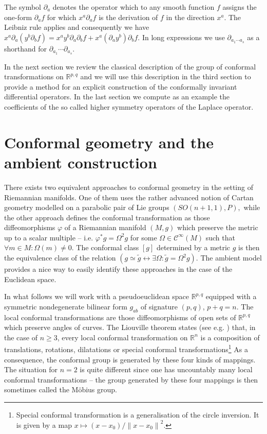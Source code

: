 \documentclass[final]{birkmult}
\theoremstyle{definition}
\theoremstyle{remark}
\numberwithin{equation}{section}
\newcommand{\p}[1]{\partial_{#1}}
\newcommand{\R}{\mathbb{R}^{p,q}}
\begin{document}
  The symbol $\p{a}$ denotes the operator which to any smooth function $f$ assigns the one-form $\p{a} f$ for which $x^a\p{a} f$ is the derivation of $f$ in the direction $x^a$. The Leibniz rule applies and consequently we have $x^a\p{a} (y^b\p{b}f) =x^a y^b \p{a} \p{b} f + x^a(\p{a}y^b) \p{b} f$. In long expressions we use $\p{a_1\cdots a_s}$ as a shorthand for $\p{a_1}\cdots \p{a_s}$.

  In the next section we review the classical  description of the group of conformal transformations on $\R$ and we will use this description in the third section to provide a method for an explicit construction of the conformally invariant differential operators. In the last section we compute as an example the coefficients of the so called higher symmetry operators of the Laplace operator. 

\section{Conformal geometry and the ambient construction}

  There exists two equivalent approaches to conformal geometry in the setting of Riemannian manifolds. One of them uses the rather advanced notion of Cartan geometry modelled on a parabolic pair of Lie groups $(SO(n+1,1),P),$ while the other approach defines the conformal transformation as those diffeomorphisms $\varphi$ of a Riemannian manifold $(M,g)$ which preserve the metric up to a scalar multiple -- i.e. $\varphi^* g = \Omega^2 g$ for some $\Omega\in\mathcal{C}^\infty(M)$ such that $\forall m\in M: \Omega(m) \neq 0$. The conformal class $[g]$ determined by a metric $g$ is then the equivalence class of the relation $(g \simeq \tilde{g} \leftrightarrow \exists \Omega: \tilde{g} = \Omega^2 g)$. The ambient model provides a nice way to easily identify these approaches in the case of the Euclidean space.

  In what follows we will work with a pseudoeuclidean space $\R$ equipped with a symmetric nondegenerate bilinear form $g_{ab}$ of signature $(p,q)$, $p+q=n$. The local conformal transformations are those diffeomorphisms of open sets of $\R$ which preserve angles of curves. The Liouville theorem states (see e.g. \cite{slovk_invariant_1992}) that, in the case of $n \geq 3$,  every local conformal transformation on $\mathbb{R}^n$ is a composition of translations, rotations, dilatations or special conformal transformations\footnote{Special conformal transformation is a generalisation of the circle inversion. It is given by a map $x \mapsto (x-x_0)/{\lVert x-x_0\rVert}^2$.} As a consequence, the conformal group is generated by these four kinds of mappings. The situation for $n=2$ is quite different since one has uncountably many local conformal transformations -- the group generated by these four mappings is then sometimes called the M\"obius group.
\end{document}
